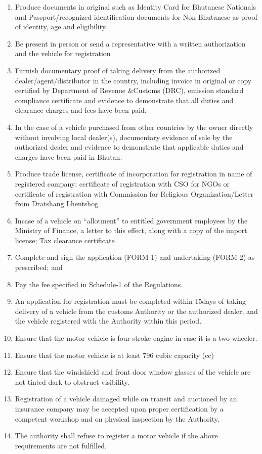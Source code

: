 \documentclass[
]{book}
\providecommand{\tightlist}{%
  \setlength{\itemsep}{0pt}\setlength{\parskip}{0pt}}
\begin{document}
\begin{enumerate}
\def\labelenumi{\alph{enumi}.}
\tightlist
\item
  Produce documents in original such as Identity Card for Bhutanese Nationals and Passport/recognized identification documents for Non-Bhutanese as proof of identity, age and eligibility.
\item
  Be present in person or send a representative with a written authorization and the vehicle for registration
\item
  Furnish documentary proof of taking delivery from the authorized dealer/agent/distributor in the country, including invoice in original or copy certified by Department of Revenue \&Customs (DRC), emission standard compliance certificate and evidence to demonstrate that all duties and clearance charges and fees have been paid;
\item
  In the case of a vehicle purchased from other countries by the owner directly without involving local dealer(s), documentary evidence of sale by the authorized dealer and evidence to demonstrate that applicable duties and charges have been paid in Bhutan.
\item
  Produce trade license, certificate of incorporation for registration in name of registered company; certificate of registration with CSO for NGOs or certificate of registration with Commission for Religious Organization/Letter from Dratshang Lhentshog
\item
  Incase of a vehicle on ``allotment'' to entitled government employees by the Ministry of Finance, a letter to this effect, along with a copy of the import license; Tax clearance certificate
\item
  Complete and sign the application (FORM 1) and undertaking (FORM 2) as prescribed; and
\item
  Pay the fee specified in Schedule-1 of the Regulations.
\item
  An application for registration must be completed within 15days of taking delivery of a vehicle from the customs Authority or the authorized dealer, and the vehicle registered with the Authority within this period.
\item
  Ensure that the motor vehicle is four-stroke engine in case it is a two wheeler.
\item
  Ensure that the motor vehicle is at least 796 cubic capacity (cc)
\item
  Ensure that the windshield and front door window glasses of the vehicle are not tinted dark to obstruct visibility.
\item
  Registration of a vehicle damaged while on transit and auctioned by an insurance company may be accepted upon proper certification by a competent workshop and on physical inspection by the Authority.
\item
  The authority shall refuse to register a motor vehicle if the above requirements are not fulfilled.
\end{enumerate}
\end{document}
